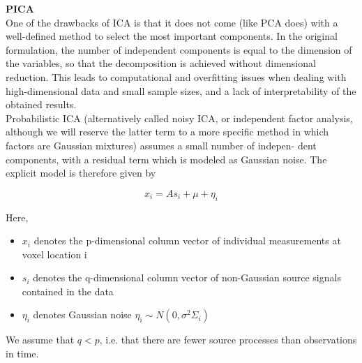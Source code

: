 \textbf{PICA} \\ 
One of the drawbacks of ICA is that it does not come (like PCA does) with a well-defined method to select the most important components. In the original formulation, the number of independent components is equal to the dimension of the variables, so that the decomposition is achieved without dimensional reduction. This leads to computational and overfitting issues when dealing with high-dimensional data and small sample sizes, and a lack of interpretability of the obtained results.\\
Probabilistic ICA (alternatively called noisy ICA, or independent factor analysis, although we will reserve the latter term to a more specific method in which factors are Gaussian mixtures) assumes a small number of indepen- dent components, with a residual term which is modeled as Gaussian noise. The explicit model is therefore given by

$$ x_i = As_i + \mu + \eta_i  $$

Here,
\begin{itemize}
\itemsep-1em
    \item $x_i$ denotes the p-dimensional column vector of individual measurements at voxel location i
    \item $s_i$ denotes the q-dimensional column vector of non-Gaussian source signals contained in the data
    \item $\eta_i$ denotes Gaussian noise $\eta_i ∼ N (0, \sigma^2\Sigma_i)$
\end{itemize}

We assume that $q < p$, i.e. that there are fewer source processes than observations in time.


